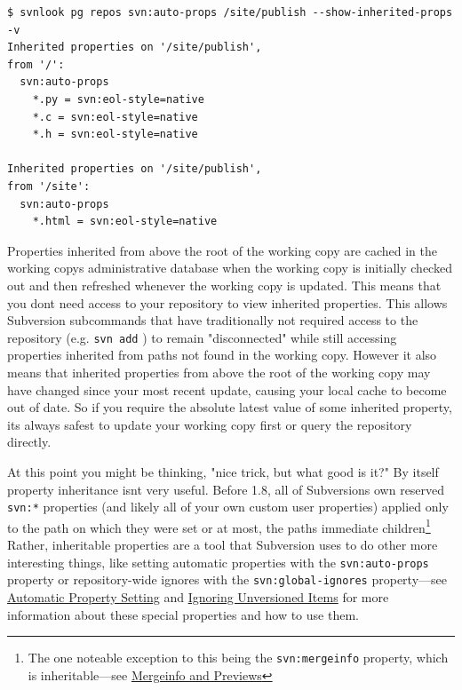 \begin{verbatim}
$ svnlook pg repos svn:auto-props /site/publish --show-inherited-props -v
Inherited properties on '/site/publish',
from '/':
  svn:auto-props
    *.py = svn:eol-style=native
    *.c = svn:eol-style=native
    *.h = svn:eol-style=native

Inherited properties on '/site/publish',
from '/site':
  svn:auto-props
    *.html = svn:eol-style=native
\end{verbatim}

Properties inherited from above the root of the working copy are cached
in the working copy\textquotesingle s administrative database when the
working copy is initially checked out and then refreshed whenever the
working copy is updated. This means that you don\textquotesingle t need
access to your repository to view inherited properties. This allows
Subversion subcommands that have traditionally not required access to
the repository (e.g. \texttt{svn\ add} ) to remain "disconnected" while
still accessing properties inherited from paths not found in the working
copy. However it also means that inherited properties from above the
root of the working copy may have changed since your most recent update,
causing your local cache to become out of date. So if you require the
absolute latest value of some inherited property, it\textquotesingle s
always safest to update your working copy first or query the repository
directly.

At this point you might be thinking, "nice trick, but what good is it?"
By itself property inheritance isn\textquotesingle t very useful. Before
1.8, all of Subversion\textquotesingle s own reserved \texttt{svn:*}
properties (and likely all of your own custom user properties) applied
only to the path on which they were set or at most, the
path\textquotesingle s immediate children\footnote{The one noteable
  exception to this being the \texttt{svn:mergeinfo} property, which is
  inheritable---see
  \hyperref[svn.branchmerge.basicmerging.mergeinfo]{Mergeinfo and
  Previews}} Rather, inheritable properties are a tool that Subversion
uses to do other more interesting things, like setting automatic
properties with the \texttt{svn:auto-props} property or repository-wide
ignores with the \texttt{svn:global-ignores} property---see
\hyperref[svn.advanced.props.auto]{Automatic Property Setting} and
\hyperref[svn.advanced.props.special.ignore]{Ignoring Unversioned Items}
for more information about these special properties and how to use them.

